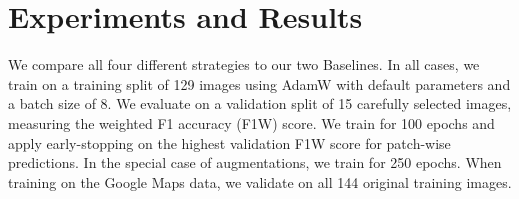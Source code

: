 \documentclass[10pt,conference,compsocconf]{IEEEtran}
\begin{document}

\section{Experiments and Results}
We compare all four different strategies to our two Baselines. In all cases, we train on a training split of 129 images using AdamW \cite{adamw} with default parameters and a batch size of 8. We evaluate on a validation split of 15 carefully selected images, measuring the weighted F1 accuracy (F1W) score. We train for 100 epochs and apply early-stopping on the highest validation F1W score for patch-wise predictions. In the special case of augmentations, we train for 250 epochs. When training on the Google Maps data, we validate on all 144 original training images.
\end{document}

